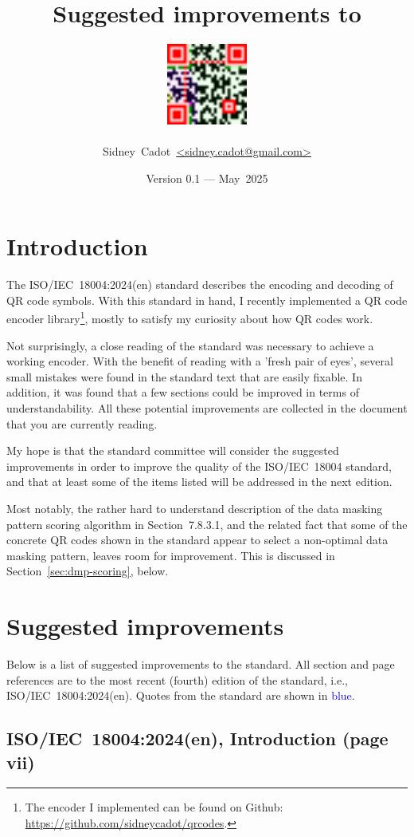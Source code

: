 \documentclass[a4paper,twoside]{article}
\title{Suggested improvements to \standard}
\author{\includegraphics[width=0.2\textwidth]{images/email.png} \\ \\ Sidney~Cadot~\url{<sidney.cadot@gmail.com>}}
\date{Version 0.1 --- May~2025}
\newcommand{\shortstandard}{ISO/IEC~18004}
\newcommand{\standard}{\shortstandard:2024(en)}
\begin{document}
%
%
\maketitle
%
%
\section{Introduction}

The \standard{} standard describes the encoding and decoding of QR code symbols. With this standard in hand,
I recently implemented a QR code encoder library\footnote{The encoder I implemented can be found on Github:
\url{https://github.com/sidneycadot/qrcodes}.}, mostly to satisfy my curiosity about how QR codes work.

Not surprisingly, a close reading of the standard was necessary to achieve a working encoder. With the benefit
of reading with a 'fresh pair of eyes', several small mistakes were found in the standard text that are easily
fixable. In addition, it was found that a few sections could be improved in terms of understandability. All
these potential improvements are collected in the document that you are currently reading.

My hope is that the standard committee will consider the suggested improvements in order to improve the
quality of the \shortstandard{} standard, and that at least some of the items listed will be addressed in
the next edition.

Most notably, the rather hard to understand description of the data masking pattern scoring algorithm in
Section~7.8.3.1, and the related fact that some of the concrete QR codes shown in the standard appear to
select a non-optimal data masking pattern, leaves room for improvement. This is discussed in
Section~\ref{sec:dmp-scoring}, below.

\section{Suggested improvements}

Below is a list of suggested improvements to the standard. All section and page references are to the most recent (fourth)
edition of the standard, i.e., \standard. Quotes from the standard are shown in \textcolor{blue}{blue}.

\subsection{\standard, Introduction (page vii)}
\end{document}
